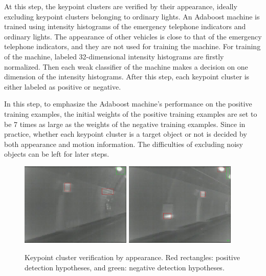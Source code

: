 At this step, the keypoint clusters are verified by their appearance, ideally excluding keypoint clusters belonging to ordinary lights. An Adaboost machine is trained using intensity histograms of the emergency telephone indicators and ordinary lights. The appearance of other vehicles is close to that of the emergency telephone indicators, and they are not used for training the machine. For training of the machine, labeled 32-dimensional intensity histograms are firstly normalized. Then each weak classifier of the machine makes a decision on one dimension of the intensity histograms. After this step, each keypoint cluster is either labeled as positive or negative.

In this step, to emphasize the Adaboost machine's performance on the positive training examples,  the initial weights of the positive training examples are set to be 7 times as large as the weights of the negative training examples.  Since in practice, whether each keypoint cluster is a target object or not is decided by both appearance and motion information. The difficulties of excluding noisy objects can be left for later steps.
\begin{figure}[b]
\includegraphics[width=0.47\textwidth,bb=0 0 640 480]{17Rgsimg00039.jpg}
\includegraphics[width=0.47\textwidth,bb=0 0 640 480]{8Rgsimg00028.jpg}
\caption[Keypoint cluster verification by appearance]{Keypoint cluster verification by appearance. Red rectangles: positive detection hypotheses, and green: negative detection hypotheses.}
\label{fig:fif}
\end{figure}

